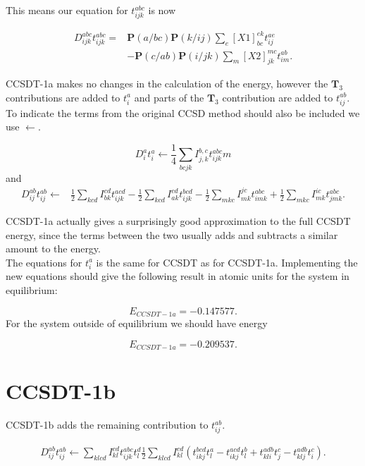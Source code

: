 \documentclass[a4paper,norsk,11pt,twoside]{report}
\begin{document}
This means our equation for $t_{ijk}^{abc}$ is now

\begin{align}
D_{ijk}^{abc} t_{ijk}^{abc} = & \textbf{P}(a/bc) \textbf{P}(k/ij) \sum_e [X1]^{ek}_{bc} t_{ij}^{ae} \\ \nonumber &
- \textbf{P}(c/ab) \textbf{P}(i/jk) \sum_m [X2]_{jk}^{mc} t_{im}^{ab} .
\end{align}

CCSDT-1a makes no changes in the calculation of the energy, however the $\textbf{T}_3$ contributions are added to $t_i^a$ and parts of the $\textbf{T}_3$ contribution are added to $t_{ij}^{ab}$. To indicate the terms from the original CCSD method should also be included we use $\leftarrow$. 

\begin{equation}
D_i^a t_i^a \leftarrow \frac{1}{4} \sum_{bcjk}  I_{j,k}^{b,c} t_{ijk}^{abc} m
\end{equation}
and
\begin{align}
D_{ij}^{ab} t_{ij}^{ab} \leftarrow & 
\frac{1}{2} \sum_{kcd} I_{bk}^{cd} t_{ijk}^{acd}
- \frac{1}{2} \sum_{kcd} I_{ak}^{cd} t_{ijk}^{bcd} - \frac{1}{2} \sum_{mkc} I_{mk}^{jc} t_{imk}^{abc} + \frac{1}{2} \sum_{mkc} I_{mk}^{ic} t_{jmk}^{abc} .
\end{align}

CCSDT-1a actually gives a surprisingly good approximation to the full CCSDT energy, since the terms between the two usually adds and subtracts a similar amount to the energy. \\

The equations for $t_i^a$ is the same for CCSDT as for CCSDT-1a. Implementing the new equations should give the following result in atomic units for the system in equilibrium:

\begin{equation}
E_{CCSDT-1a} = -0.147577 .
\end{equation}
For the system outside of equilibrium we should have energy

\begin{equation}
E_{CCSDT-1a} = -0.209537 .
\end{equation}

\section{CCSDT-1b}
CCSDT-1b adds the remaining contribution to $t_{ij}^{ab}$. 

\begin{align}
D_{ij}^{ab} t_{ij}^{ab} \leftarrow
\sum_{klcd} I_{kl}^{cd} t_{ijk}^{abc} t_l^d  \frac{1}{2} \sum_{klcd} I_{kl}^{cd} \left(
 t_{ikj}^{bcd} t_l^a - t_{ikj}^{acd} t_l^b 
 + t_{kli}^{adb} t_j^c - t_{klj}^{adb} t_i^c \right) .
\end{align}
\end{document}
